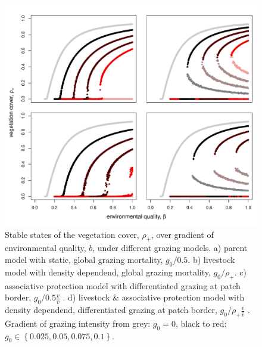 \begin{figure}[h]%
\includegraphics[width=\columnwidth]{figures/stability.pdf}%
\caption{Stable states of the vegetation cover, $\rho_+$, over gradient of environmental quality, $b$, under different grazing models. a) parent model with static, global grazing mortality, $g_0/0.5$. b) livestock model with density dependend, global grazing mortality, $g_0 / \rho_+$. c) associative protection model with differentiated grazing at patch border, $g_0/0.5 \frac{v}{\hat{v}}$ . d) livestock \& associative protection model with density dependend, differentiated grazing at patch border,  $g_0/ \rho_+ \frac{v}{\hat{v}}$ . Gradient of grazing intensity from grey: $g_0 = 0$, black to red: $g_0 \in \left\{ 0.025, 0.05, 0.075, 0.1 \right\}$.}%
\label{}%
\end{figure}


